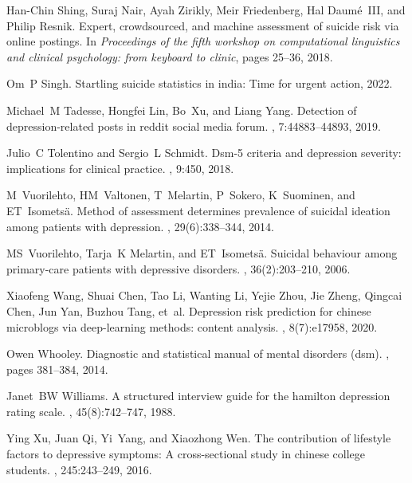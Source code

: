\begin{thebibliography}{10}
Han-Chin Shing, Suraj Nair, Ayah Zirikly, Meir Friedenberg, Hal Daum{\'e}~III,
  and Philip Resnik.
\newblock Expert, crowdsourced, and machine assessment of suicide risk via
  online postings.
\newblock In {\em Proceedings of the fifth workshop on computational
  linguistics and clinical psychology: from keyboard to clinic}, pages 25--36,
  2018.

Om~P Singh.
\newblock Startling suicide statistics in india: Time for urgent action, 2022.

Michael~M Tadesse, Hongfei Lin, Bo~Xu, and Liang Yang.
\newblock Detection of depression-related posts in reddit social media forum.
, 7:44883--44893, 2019.

Julio~C Tolentino and Sergio~L Schmidt.
\newblock Dsm-5 criteria and depression severity: implications for clinical
  practice.
, 9:450, 2018.

M~Vuorilehto, HM~Valtonen, T~Melartin, P~Sokero, K~Suominen, and
  ET~Isomets{\"a}.
\newblock Method of assessment determines prevalence of suicidal ideation among
  patients with depression.
, 29(6):338--344, 2014.

MS~Vuorilehto, Tarja~K Melartin, and ET~Isomets{\"a}.
\newblock Suicidal behaviour among primary-care patients with depressive
  disorders.
, 36(2):203--210, 2006.

Xiaofeng Wang, Shuai Chen, Tao Li, Wanting Li, Yejie Zhou, Jie Zheng, Qingcai
  Chen, Jun Yan, Buzhou Tang, et~al.
\newblock Depression risk prediction for chinese microblogs via deep-learning
  methods: content analysis.
, 8(7):e17958, 2020.

Owen Whooley.
\newblock Diagnostic and statistical manual of mental disorders (dsm).
, pages 381--384, 2014.

Janet~BW Williams.
\newblock A structured interview guide for the hamilton depression rating
  scale.
, 45(8):742--747, 1988.

Ying Xu, Juan Qi, Yi~Yang, and Xiaozhong Wen.
\newblock The contribution of lifestyle factors to depressive symptoms: A
  cross-sectional study in chinese college students.
, 245:243--249, 2016.


\end{thebibliography}
